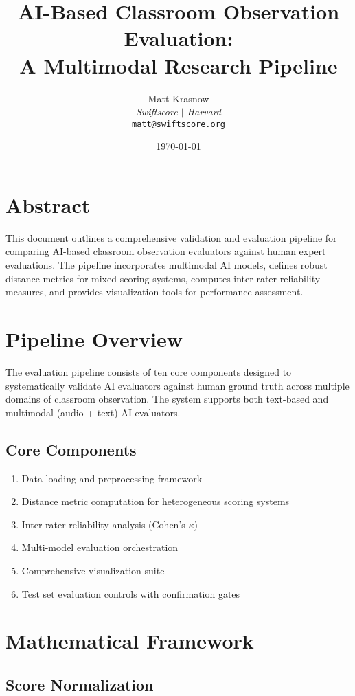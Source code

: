 \documentclass[12pt]{article}
\title{\textbf{AI-Based Classroom Observation Evaluation: \\
A Multimodal Research Pipeline}}
\author{Matt Krasnow \\
\textit{Swiftscore $\mid$ Harvard} \\
\texttt{matt@swiftscore.org}}
\date{\today}
\begin{document}
\maketitle

\section{Abstract}

This document outlines a comprehensive validation and evaluation pipeline for comparing AI-based classroom observation evaluators against human expert evaluations. The pipeline incorporates multimodal AI models, defines robust distance metrics for mixed scoring systems, computes inter-rater reliability measures, and provides visualization tools for performance assessment.

\section{Pipeline Overview}

The evaluation pipeline consists of ten core components designed to systematically validate AI evaluators against human ground truth across multiple domains of classroom observation. The system supports both text-based and multimodal (audio + text) AI evaluators.

\subsection{Core Components}
\begin{enumerate}
    \item Data loading and preprocessing framework
    \item Distance metric computation for heterogeneous scoring systems
    \item Inter-rater reliability analysis (Cohen's $\kappa$)
    \item Multi-model evaluation orchestration
    \item Comprehensive visualization suite
    \item Test set evaluation controls with confirmation gates
\end{enumerate}

\section{Mathematical Framework}

\subsection{Score Normalization}
\end{document}
